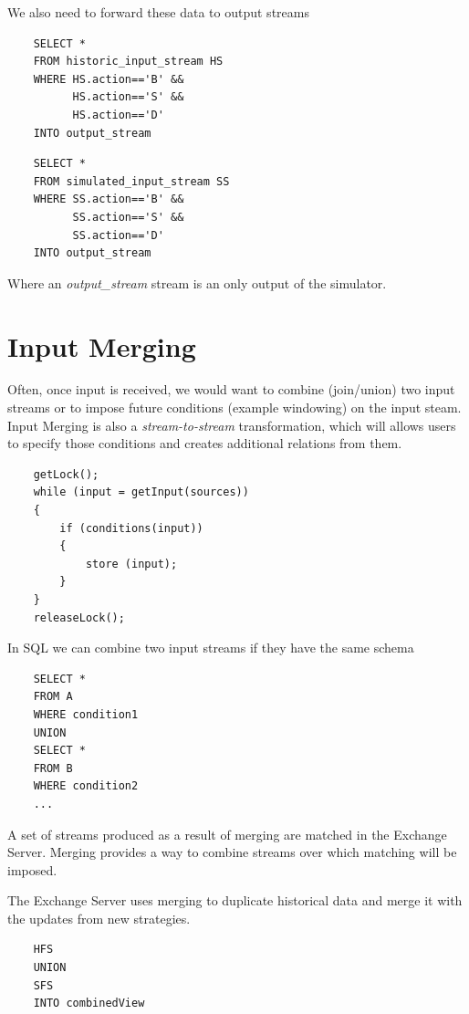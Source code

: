 \documentclass{article}
\begin{document}
\noindent We also need to forward these data to output streams

\begin{verbatim}   
    SELECT * 
    FROM historic_input_stream HS
    WHERE HS.action=='B' &&
          HS.action=='S' &&
          HS.action=='D'
    INTO output_stream
\end{verbatim}

\begin{verbatim}  
    SELECT *
    FROM simulated_input_stream SS
    WHERE SS.action=='B' &&
          SS.action=='S' &&
          SS.action=='D'
    INTO output_stream
\end{verbatim}

\noindent Where an \emph{output\_stream} stream is an only output of the simulator. 


\section{Input Merging}

Often, once input is received, we would want to combine (join/union) two input streams or to impose future conditions (example windowing) on the input steam. Input Merging is also a \emph{stream-to-stream} transformation, which will allows users to specify those conditions and creates additional relations from them.

\begin{verbatim}   
    getLock();
    while (input = getInput(sources))
    {
        if (conditions(input))
        {
            store (input);
        }
    }
    releaseLock();
\end{verbatim}


\noindent In SQL we can combine two input streams if they have the same schema 

\begin{verbatim}   
    SELECT *
    FROM A
    WHERE condition1
    UNION
    SELECT *
    FROM B
    WHERE condition2
    ...
\end{verbatim}


A set of streams produced as a result of merging are matched in the Exchange Server. Merging provides a way to combine streams over which matching will be imposed. 

The Exchange Server uses merging to duplicate historical data and merge it with the updates from new strategies.

\begin{verbatim}  
    HFS
    UNION
    SFS
    INTO combinedView
\end{verbatim}
\end{document}
